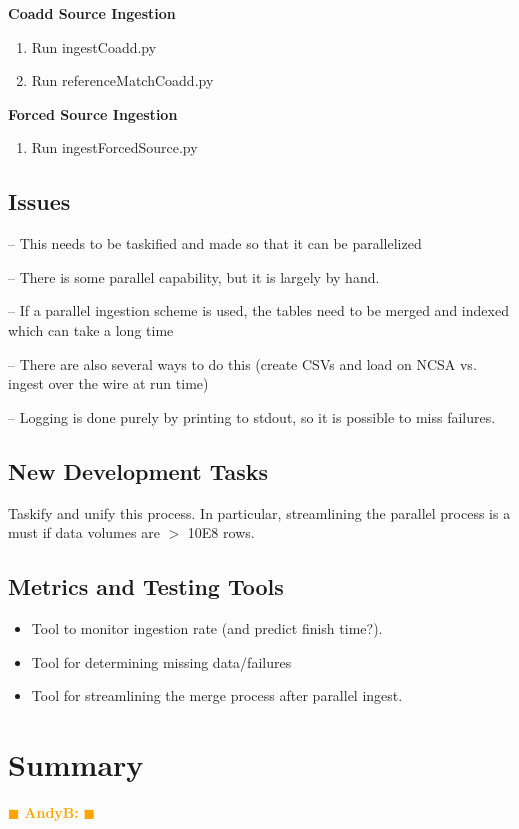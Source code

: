 \documentclass[12pt]{article}
\newcommand{\becker} { \textcolor{orange} {
\ensuremath{\blacksquare} {\bf AndyB:}  
\ensuremath{\blacksquare} } }
\begin{document}
{\bf Coadd Source Ingestion}
\begin{enumerate}
\item Run ingestCoadd.py
\item Run referenceMatchCoadd.py
\end{enumerate}

{\bf Forced Source Ingestion}
\begin{enumerate}
\item Run ingestForcedSource.py
\end{enumerate}

\subsection{Issues}
-- This needs to be taskified and made so that it can be parallelized

-- There is some parallel capability, but it is largely by hand.

-- If a parallel ingestion scheme is used, the tables need to be merged and indexed which can take a long time

-- There are also several ways to do this (create CSVs and load on NCSA vs. ingest over the wire at run time)

-- Logging is done purely by printing to stdout, so it is possible to miss failures.

\subsection{New Development Tasks}
Taskify and unify this process.  In particular, streamlining the parallel process is a must if data volumes are $>$ 10E8 rows.

\subsection{Metrics and Testing Tools}
\begin{itemize}
\item Tool to monitor ingestion rate (and predict finish time?).
\item Tool for determining missing data/failures
\item Tool for streamlining the merge process after parallel ingest.
\end{itemize}

\clearpage 
\section{Summary} \becker
\end{document}

